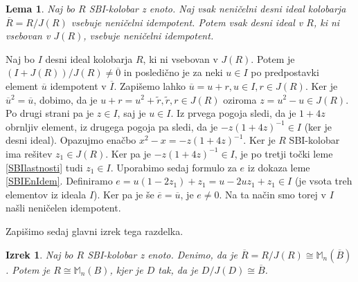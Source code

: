 \documentclass[a4paper, 12pt]{amsart}
\theoremstyle{definition} %
\theoremstyle{plain} %
\newtheorem{lema}[definicija]{Lema}
\newtheorem{izrek}[definicija]{Izrek}
\newcommand{\M}{\mathbb M}
\begin{document}
\begin{lema}
Naj bo $R$ SBI-kolobar z enoto. Naj vsak neničelni desni ideal kolobarja $\overline{R} = R/J(R)$ vsebuje neničelni idempotent. Potem vsak desni ideal v $R$, ki ni vsebovan v $J(R)$, vsebuje neničelni idempotent.
\end{lema}

\proof
Naj bo $I$ desni ideal kolobarja $R$, ki ni vsebovan v $J(R)$. Potem je $(I+J(R))/J(R) \neq \overline{0}$ in posledično je za neki $u\in I$ po predpostavki element $\overline{u}$ idempotent v $\overline{I}$. Zapišemo lahko $\overline{u} = u + r, u\in I, r \in J(R)$. Ker je $\overline{u}^2 = \overline{u}$, dobimo, da je $u+r = u^2 + \tilde{r}, \tilde{r},r\in J(R)$ oziroma $z= u^2 - u\in J(R)$. Po drugi strani pa je $z\in I$, saj je $u\in I$. Iz prvega pogoja sledi, da je $1+4z$ obrnljiv element, iz drugega pogoja pa sledi, da je $-z(1+4z)^{-1}\in I $ (ker je desni ideal). Opazujmo enačbo $x^2 - x = -z(1+4z)^{-1} $. Ker je $R$ SBI-kolobar ima rešitev $z_1 \in J(R)$. Ker pa je $-z(1+4z)^{-1}\in I$, je po tretji točki leme \ref{SBIlastnosti} tudi $z_1\in I$. Uporabimo sedaj formulo za $e$ iz dokaza leme \ref{SBIEnIdem}. Definiramo $e=u(1-2z_1) + z_1 = u - 2uz_1 + z_1\in I$ (je vsota treh elementov iz ideala  $I$). Ker pa je še $\overline{e} = \overline{u}$, je $e\neq 0$. Na ta način smo torej v $I$ našli neničelen idempotent.
\endproof

Zapišimo sedaj glavni izrek tega razdelka.

\begin{izrek}
\label{SBIizrek}
Naj bo $R$ SBI-kolobar z enoto. Denimo, da je $\overline{R}  = R/J(R) \cong \M_n(\overline{B})$. Potem je $R \cong \M_n(B)$, kjer je $D$ tak, da je  $D/J(D) \cong \overline{B}$.
\end{izrek}
\end{document}
